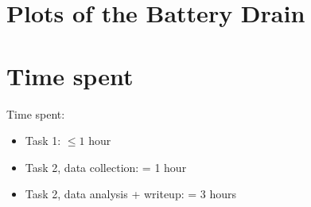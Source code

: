 \documentclass{lab}
\begin{document}
\section{Plots of the Battery Drain}

\section{Time spent}

Time spent:

\begin{itemize}
  \item Task 1: $\leq 1$ hour
  \item Task 2, data collection: = 1 hour
  \item Task 2, data analysis + writeup: = 3 hours
\end{itemize}
\end{document}
